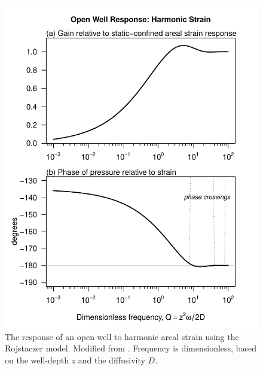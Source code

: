 \documentclass[10pt]{article}\usepackage[]{graphicx}\usepackage[]{color}
\makeatletter
\def\maxwidth{ %
  \ifdim\Gin@nat@width>\linewidth
    \linewidth
  \else
    \Gin@nat@width
  \fi
}
\newenvironment{knitrout}{}{} %
\makeatother
\begin{document}
\begin{figure}[htb!]
\begin{center}
\begin{knitrout}
\color{fgcolor}
\includegraphics[width=\maxwidth]{figure/ROJRESPFIG} 

\end{knitrout}

\caption{The response of an open well to harmonic areal strain using
the Rojstaczer model. Modified from \citet[][Fig.~3]{rojstaczer1988}.
Frequency is dimensionless, based on the well-depth $z$ and the diffusivity
$D$.}
\label{fig:tmp}
\end{center}
\end{figure}




\printindex
\end{document}
